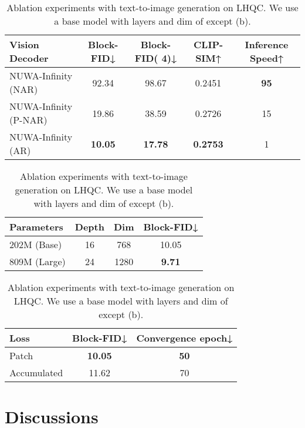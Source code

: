 \documentclass{article}
\begin{document}
\begin{table}[t!] 
\small
\begin{subtable}{1.\textwidth}
\centering 
\begin{tabular}{lcccc} 
\toprule
Vision Decoder & Block-FID↓ & Block-FID( 4)↓ & CLIP-SIM↑ & Inference Speed↑ \\ \hline
NUWA-Infinity (NAR)   & 92.34 & 98.67 & 0.2451  & \textbf{95} \\
NUWA-Infinity (P-NAR) & 19.86 & 38.59 & 0.2726  & 15          \\
NUWA-Infinity (AR)    & \textbf{10.05} & \textbf{17.78} & \textbf{0.2753}    & 1  \\
\bottomrule
\end{tabular}
\caption{Decoder model.}
\label{tab:rendermodel}
\end{subtable}
\begin{subtable}{.48\linewidth}
\setlength{\tabcolsep}{4.5pt}
\begin{tabular}{lccc}
\toprule
Parameters  & Depth & Dim  & Block-FID↓ \\ \hline
202M (Base)  & 16    & 768  & 10.05      \\
809M (Large) & 24    & 1280 & \textbf{9.71}  \\
\bottomrule
\end{tabular}
\caption{Decoder size.}
\label{tab:modelsize}
\end{subtable}
\hspace{0.6em}
\begin{subtable}{.45\linewidth}
\setlength{\tabcolsep}{1.5pt}
\centering
\begin{tabular}{lcc}
\toprule
Loss  & Block-FID↓ & Convergence epoch↓ \\ \hline
Patch & \textbf{10.05}         & \textbf{50}                 \\
Accumulated  & 11.62         & 70   \\ 
\bottomrule
\end{tabular}
\caption{Decoder loss.}
\label{tab:lossregion}
\end{subtable}
\caption{Ablation experiments with text-to-image generation on LHQC. We use a base model with  layers and dim of  except (b). } \label{tab:ablation_five}
\end{table}

\section{Discussions}
\end{document}
